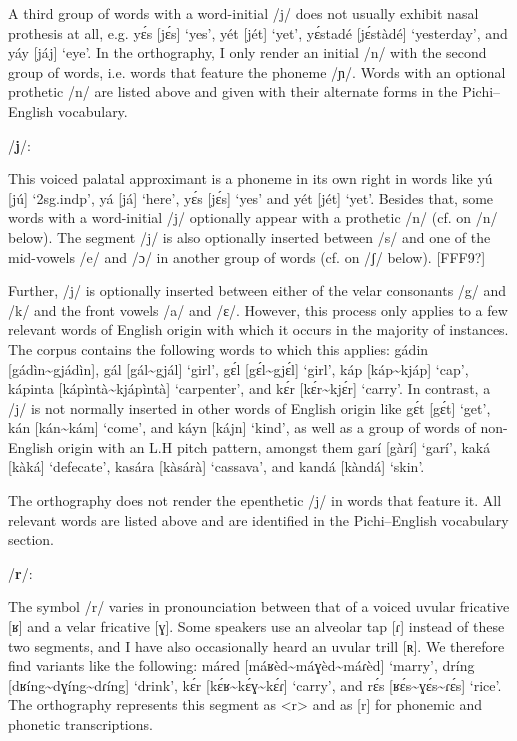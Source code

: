 A third group of words with a word-initial /j/ does not usually exhibit nasal prothesis at all, e.g. yɛ́s [jɛ́s] ‘yes’, yét [jét] ‘yet’, yɛ́stadé [jɛ́stàdé] ‘yesterday’, and yáy [jáj] ‘eye’. In the orthography, I only render an initial /n/ with the second group of words, i.e. words that feature the phoneme /ɲ/. Words with an optional prothetic /n/ are listed above and given with their alternate forms in the Pichi–English vocabulary.


/\textbf{j}/:

This voiced palatal approximant is a phoneme in its own right in words like yú [jú] ‘2sg.indp’, yá [já] ‘here’, yɛ́s [jɛ́s] ‘yes’ and yét [jét] ‘yet’. Besides that, some words with a word-initial /j/ optionally appear with a prothetic /n/ (cf. on /n/ below). The segment /j/ is also optionally inserted between /s/ and one of the mid-vowels /e/ and /ɔ/ in another group of words (cf. on /ʃ/ below). [FFF9?]


Further, /j/ is optionally inserted between either of the velar consonants /g/ and /k/ and the front vowels /a/ and /ɛ/. However, this process only applies to a few relevant words of English origin with which it occurs in the majority of instances. The corpus contains the following words to which this applies: gádin [gádìn{\textasciitilde}gjádìn], gál [gál{\textasciitilde}gjál] ‘girl’, gɛ́l [gɛ́l{\textasciitilde}gjɛ́l] ‘girl’, káp [káp{\textasciitilde}kjáp] ‘cap’, kápinta [kápìntà{\textasciitilde}kjápìntà] ‘carpenter’, and kɛ́r [kɛ́r{\textasciitilde}kjɛ́r] ‘carry’. In contrast, a /j/ is not normally inserted in other words of English origin like gɛ́t [gɛ́t] ‘get’, kán [kán{\textasciitilde}kám] ‘come’, and káyn [kájn] ‘kind’, as well as a group of words of non-English origin with an L.H pitch pattern, amongst them garí [gàrí] ‘garí’, kaká [kàká] ‘defecate’, kasára [kàsárà] ‘cassava’, and kandá [kàndá] ‘skin’. 



The orthography does not render the epenthetic /j/ in words that feature it. All relevant words are listed above and are identified in the Pichi–English vocabulary section. 


/\textbf{r}/:

The symbol /r/ varies in pronounciation between that of a voiced uvular fricative [ʁ] and a velar fricative [ɣ]. Some speakers use an alveolar tap [ɾ] instead of these two segments, and I have also occasionally heard an uvular trill [ʀ]. We therefore find variants like the following: máred [máʁèd{\textasciitilde}máɣèd{\textasciitilde}máɾèd] ‘marry’, dríng [dʁíng{\textasciitilde}dɣíng{\textasciitilde}dɾíng] ‘drink’, kɛ́r [kɛ́ʁ{\textasciitilde}kɛ́ɣ{\textasciitilde}kɛ́ɾ] ‘carry’, and rɛ́s [ʁɛ́s{\textasciitilde}ɣɛ́s{\textasciitilde}ɾɛ́s] ‘rice’. The orthography represents this segment as <r> and as [r] for phonemic and phonetic transcriptions.

